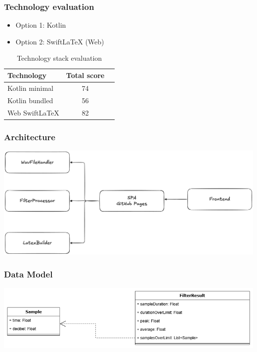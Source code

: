 \begin{frame}
    \frametitle{Technology evaluation}
    \begin{itemize}
        \large
        \item Option 1: Kotlin
        \item Option 2: SwiftLaTeX (Web)
    \end{itemize}
    \par\vspace{0.5cm}
    \centering
    \begin{table}[H]
        \centering
        \begin{tabular}{|l|c|c|}
            \hline
            \textbf{Technology} & \textbf{Total score} \\
            \hline
            Kotlin minimal & 74 \\
            \hline
            Kotlin bundled & 56 \\
            \hline
            Web SwiftLaTeX & 82 \\
            \hline
        \end{tabular}
        \caption{Technology stack evaluation}
        \label{table:technology_evaluation}
    \end{table}
\end{frame}

\begin{frame}
    \frametitle{Architecture}
    \centering
    \includegraphics[width=0.85\linewidth]{../assets/architecture.png}
\end{frame}

\begin{frame}
    \frametitle{Data Model}
    \centering
    \includegraphics[width=0.85\linewidth]{../assets/interface.png}
\end{frame}

